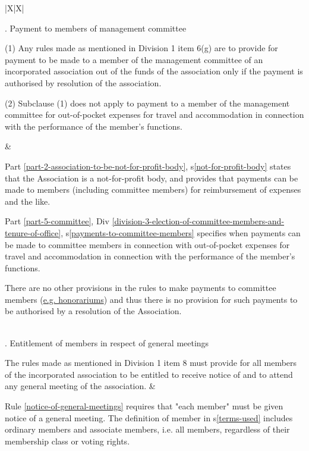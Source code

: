 \documentclass[../constitution.tex]{subfiles}
\begin{document}
{\def\arraystretch{1.3}
\begin{xltabular}{\textwidth}{ |X|X| }

. Payment to members of management committee 

\bigskip

(1) Any rules made as mentioned in Division 1 item 6(g) are to provide 
for payment to be made to a member of the management committee of 
an incorporated association out of the funds of the association only if 
the payment is authorised by resolution of the association. 

\bigskip

(2) Subclause (1) does not apply to payment to a member of the 
management committee for out-of-pocket expenses for travel and 
accommodation in connection with the performance of the member's 
functions. 

&

Part \ref{part-2-association-to-be-not-for-profit-body}, s\ref{not-for-profit-body} states that the Association is a not-for-profit body, and provides that payments can be made to members (including committee members) for reimbursement of expenses and the like.

\bigskip

Part \ref{part-5-committee}, Div \ref{division-3-election-of-committee-members-and-tenure-of-office}, s\ref{payments-to-committee-members} specifies when payments can be made to committee members in connection with out-of-pocket expenses for travel and accommodation in connection with the performance of the member's functions.

\bigskip

There are no other provisions in the rules to make payments to committee members (\href{https://www.commerce.wa.gov.au/books/inc-guide-incorporated-associations-western-australia/paying-committee-members}{e.g. honorariums}) and thus there is no provision for such payments to be authorised by a resolution of the Association.

\\

. Entitlement of members in respect of general meetings 

\bigskip

 The rules made as mentioned in Division 1 item 8 must provide for all 
members of the incorporated association to be entitled to receive 
notice of and to attend any general meeting of the association. 
&

Rule \ref{notice-of-general-meetings} requires that "each member" must be given notice of a general meeting. The definition of member in s\ref{terms-used} includes ordinary members and associate members, i.e. all members, regardless of their membership class or voting rights.


\end{xltabular}}
\end{document}
